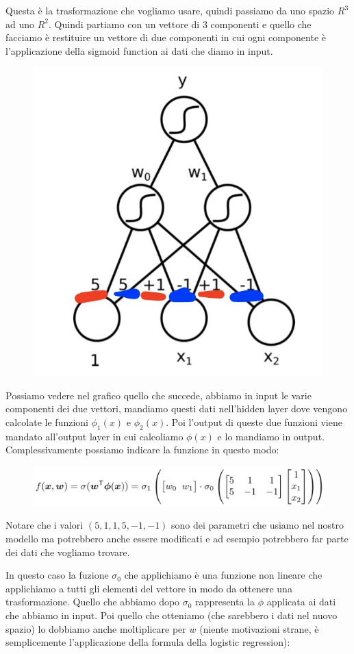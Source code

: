 \documentclass[14pt]{extreport}
\begin{document}
Questa è la trasformazione che vogliamo usare, quindi passiamo da uno spazio $R^3$ ad uno $R^2$. Quindi partiamo con un vettore di 3 componenti e
quello che facciamo è restituire un vettore di due componenti in cui ogni componente è l'applicazione della sigmoid function ai dati che diamo in
input.

\begin{figure}[H]
\centering
\includegraphics[width=0.5\linewidth]{361.jpeg}
\end{figure}

Possiamo vedere nel grafico quello che succede, abbiamo in input le varie componenti dei due vettori, mandiamo questi dati nell'hidden layer dove
vengono calcolate le funzioni $\phi_1(x)$ e $\phi_2(x)$. Poi l'output di queste due funzioni viene mandato all'output layer in cui calcoliamo
$\phi(x)$ e lo mandiamo in output. Complessivamente possiamo indicare la funzione in questo modo:

\begin{figure}[H]
\centering
\includegraphics[width=0.9\linewidth]{362.jpeg}
\end{figure}



Notare che i valori $(5,1,1,5,-1,-1)$ sono dei parametri che usiamo nel nostro modello ma potrebbero anche essere modificati e ad esempio potrebbero
far parte dei dati che vogliamo trovare.

In questo caso la fuzione $\sigma_0$ che applichiamo è una funzione non lineare che applichiamo a tutti gli elementi del vettore in modo da ottenere
una trasformazione. Quello che abbiamo dopo $\sigma_0$ rappresenta la $\phi$ applicata ai dati che abbiamo in input. Poi quello che otteniamo (che
sarebbero i dati nel nuovo spazio) lo dobbiamo anche moltiplicare per $w$ (niente motivazioni strane, è semplicemente l'applicazione della formula
della logistic regression):
\end{document}
